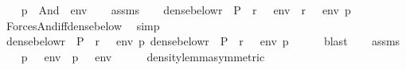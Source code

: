 \begin{isabellebody}
%
\isadelimproof
%
\endisadelimproof
%
\isatagproof
{}\isamarkupfalse%
\isanewline
\ \ \isamarkupfalse%
\ {\isachardoublequoteopen}p\ {\isasymtturnstile}\ And{\isacharparenleft}{\kern0pt}{\isasymphi}{\isacharcomma}{\kern0pt}\ {\isasympsi}{\isacharparenright}{\kern0pt}\ env{\isachardoublequoteclose}\isanewline
\ \ \isamarkupfalse%
\ assms\isanewline
\ \ \isamarkupfalse%
\ {\isachardoublequoteopen}dense{\isacharunderscore}{\kern0pt}below{\isacharparenleft}{\kern0pt}{\isacharbraceleft}{\kern0pt}r\ {\isasymin}\ P\ {\isachardot}{\kern0pt}\ {\isacharparenleft}{\kern0pt}r\ {\isasymtturnstile}\ {\isasymphi}\ env{\isacharparenright}{\kern0pt}\ {\isasymand}\ {\isacharparenleft}{\kern0pt}r\ {\isasymtturnstile}\ {\isasympsi}\ env{\isacharparenright}{\kern0pt}{\isacharbraceright}{\kern0pt}{\isacharcomma}{\kern0pt}\ p{\isacharparenright}{\kern0pt}{\isachardoublequoteclose}\isanewline
\ \ \ \ \isamarkupfalse%
\ Forces{\isacharunderscore}{\kern0pt}And{\isacharunderscore}{\kern0pt}iff{\isacharunderscore}{\kern0pt}dense{\isacharunderscore}{\kern0pt}below\ \isamarkupfalse%
\ simp\isanewline
\ \ \isamarkupfalse%
\isanewline
\ \ \isamarkupfalse%
\ {\isachardoublequoteopen}dense{\isacharunderscore}{\kern0pt}below{\isacharparenleft}{\kern0pt}{\isacharbraceleft}{\kern0pt}r\ {\isasymin}\ P\ {\isachardot}{\kern0pt}\ {\isacharparenleft}{\kern0pt}r\ {\isasymtturnstile}\ {\isasymphi}\ env{\isacharparenright}{\kern0pt}{\isacharbraceright}{\kern0pt}{\isacharcomma}{\kern0pt}\ p{\isacharparenright}{\kern0pt}{\isachardoublequoteclose}\ {\isachardoublequoteopen}dense{\isacharunderscore}{\kern0pt}below{\isacharparenleft}{\kern0pt}{\isacharbraceleft}{\kern0pt}r\ {\isasymin}\ P\ {\isachardot}{\kern0pt}\ {\isacharparenleft}{\kern0pt}r\ {\isasymtturnstile}\ {\isasympsi}\ env{\isacharparenright}{\kern0pt}{\isacharbraceright}{\kern0pt}{\isacharcomma}{\kern0pt}\ p{\isacharparenright}{\kern0pt}{\isachardoublequoteclose}\isanewline
\ \ \ \ \isamarkupfalse%
\ blast{\isacharplus}{\kern0pt}\isanewline
\ \ \isamarkupfalse%
\ assms\isanewline
\ \ \isamarkupfalse%
\ {\isachardoublequoteopen}{\isacharparenleft}{\kern0pt}p\ {\isasymtturnstile}\ {\isasymphi}\ env{\isacharparenright}{\kern0pt}\ {\isasymand}\ {\isacharparenleft}{\kern0pt}p\ {\isasymtturnstile}\ {\isasympsi}\ env{\isacharparenright}{\kern0pt}{\isachardoublequoteclose}\isanewline
\ \ \ \ \isamarkupfalse%
\ density{\isacharunderscore}{\kern0pt}lemma{\isacharbrackleft}{\kern0pt}symmetric{\isacharbrackright}{\kern0pt}\ \isamarkupfalse%

\end{isabellebody}
